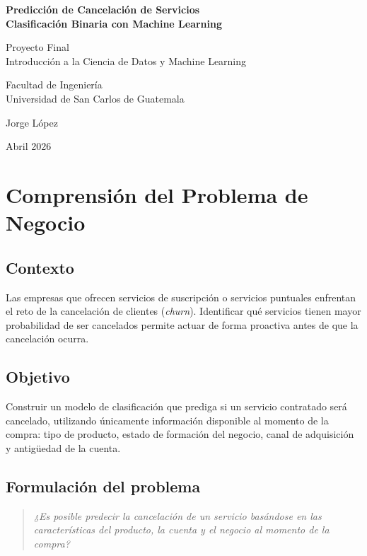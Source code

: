 \documentclass[12pt,letterpaper]{article}
\begin{document}
\begin{titlepage}
  \centering
  \vspace*{2cm}
  {\LARGE\bfseries Predicción de Cancelación de Servicios\\[0.4em]
  Clasificación Binaria con Machine Learning\par}
  \vspace{1.5cm}
  {\large Proyecto Final\\
  Introducción a la Ciencia de Datos y Machine Learning\par}
  \vspace{1cm}
  {\large Facultad de Ingeniería\\
  Universidad de San Carlos de Guatemala\par}
  \vspace{2cm}
  {\large Jorge López\par}
  \vfill
  {\large Abril 2026}
\end{titlepage}

\tableofcontents
\newpage

\section{Comprensión del Problema de Negocio}

\subsection{Contexto}
Las empresas que ofrecen servicios de suscripción o servicios puntuales enfrentan el reto
de la cancelación de clientes (\textit{churn}). Identificar qué servicios tienen mayor
probabilidad de ser cancelados permite actuar de forma proactiva antes de que la
cancelación ocurra.

\subsection{Objetivo}
Construir un modelo de clasificación que prediga si un servicio contratado será cancelado,
utilizando únicamente información disponible al momento de la compra: tipo de producto,
estado de formación del negocio, canal de adquisición y antigüedad de la cuenta.

\subsection{Formulación del problema}
\begin{quote}
\textit{¿Es posible predecir la cancelación de un servicio basándose en las características
del producto, la cuenta y el negocio al momento de la compra?}
\end{quote}
\end{document}
